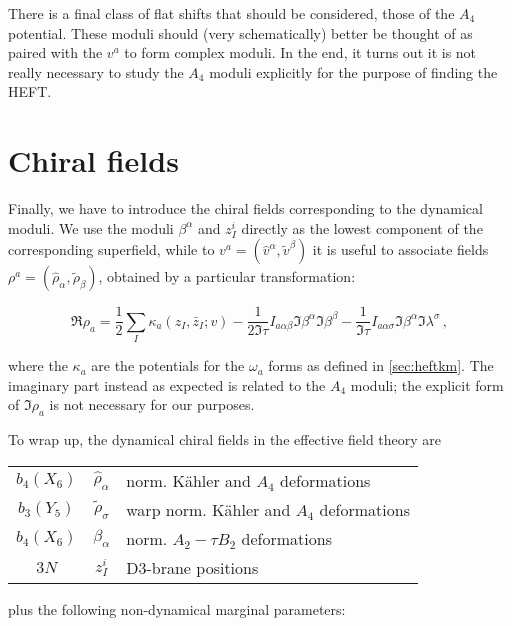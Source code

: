 There is a final class of flat shifts that should be considered, those of the $A_4$ potential. These moduli should (very schematically) better be thought of as paired with the $v^a$ to form complex moduli. In the end, it turns out it is not really necessary to study the $A_4$ moduli explicitly for the purpose of finding the HEFT.


\section{Chiral fields}

Finally, we have to introduce the chiral fields corresponding to the dynamical moduli. We use the moduli $\beta^\alpha$ and $z_I^i$ directly as the lowest component of the corresponding superfield, while to $v^a = (\hat v^\alpha,\tilde v^\beta)$ it is useful to associate fields $\rho^a = (\hat \rho_\alpha, \tilde \rho_\beta)$, obtained by a particular transformation:

\begin{equation}
	\Re{\rho_a} = \frac{1}{2}\sum_I \kappa_a(z_I, \bar z_I ; v) - \frac{1}{2 \Im \tau} I_{a\alpha\beta} \Im \beta^\alpha \Im \beta^\beta - \frac{1}{\Im \tau} I_{a\alpha\sigma} \Im \beta^\alpha \Im \lambda^\sigma\,,
	\label{rhov}
\end{equation}

where the $\kappa_a$ are the potentials for the $\omega_a$ forms as defined in \ref{sec:heftkm}. The imaginary part instead as expected is related to the $A_4$ moduli; the explicit form of $\Im \rho_a$ is not necessary for our purposes.

To wrap up, the dynamical chiral fields in the effective field theory are


\begin{center}
\begin{tabular}{|c | c | l |}
	\hline
	$b_4(X_6)$	& $\hat\rho_\alpha$	& norm. K\"ahler and $A_4$ deformations\\
	$b_3(Y_5)$	& $\tilde\rho_\sigma$	& warp norm. K\"ahler and $A_4$ deformations\\
	$b_4(X_6)$	& $\beta_\alpha$	& norm. $A_2 - \tau B_2$ deformations\\
	$3N$ 		& $z_I^i$		& D3-brane positions\\
	\hline
\end{tabular}
\end{center}

plus the following non-dynamical marginal parameters:\\

